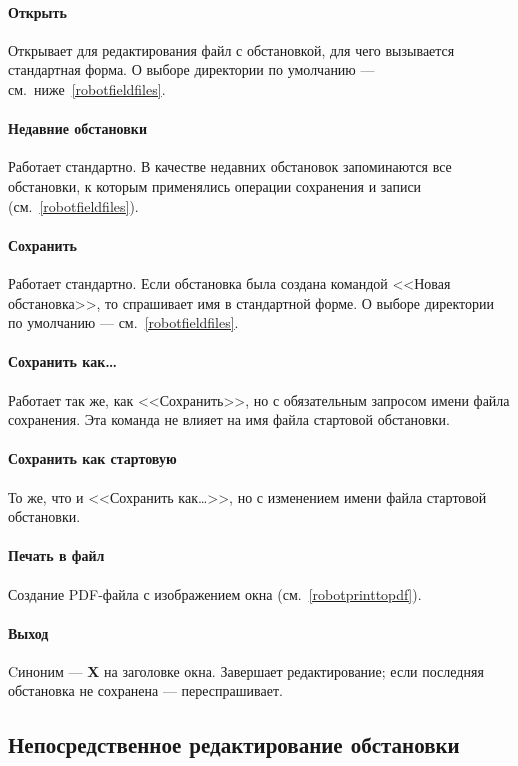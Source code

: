 \paragraph{Открыть} Открывает для редактирования файл с обстановкой, для чего  вызывается стандартная форма. О выборе директории по умолчанию --- см.~ниже~\ref{robotfieldfiles}.

\paragraph{Недавние обстановки} Работает стандартно. В качестве недавних обстановок запоминаются все обстановки, к которым применялись операции сохранения и записи (см.~\ref{robotfieldfiles}).

\paragraph{Сохранить} Работает стандартно. Если обстановка была создана командой <<Новая обстановка>>, то спрашивает имя в стандартной форме. О выборе директории по умолчанию --- см.~\ref{robotfieldfiles}.

\paragraph{Сохранить как\dots} Работает так же, как <<Сохранить>>, но с обязательным запросом имени файла сохранения. Эта команда не влияет на имя файла стартовой обстановки.

\paragraph{Сохранить как стартовую} То же, что и <<Сохранить как\dots>>, но с изменением имени файла стартовой обстановки.

\paragraph{Печать в файл} Создание PDF-файла с изображением окна (см.~\ref{robotprinttopdf}).

\paragraph{Выход} Cиноним --- \textbf{\textsf{X}} на заголовке окна. Завершает редактирование; если последняя обстановка не сохранена --- переспрашивает.

\subsection{Непосредственное редактирование обстановки}

